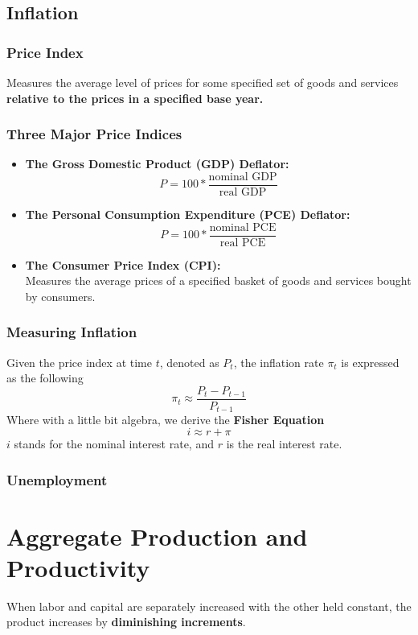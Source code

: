 \documentclass[a4paper]{article}
\begin{document}
\subsection{Inflation}
\subsubsection*{Price Index}
Measures the average level of prices for some specified set of goods and services 
\textbf{relative to the prices in a specified base year.}
\subsubsection*{Three Major Price Indices} \begin{itemize}
    \item \textbf{The Gross Domestic Product (GDP) Deflator:}
    \[ P = 100 * \frac{\text{nominal GDP}}{\text{real GDP}} \]
    \item \textbf{The Personal Consumption Expenditure (PCE) Deflator:}
    \[ P = 100 * \frac{\text{nominal PCE}}{\text{real PCE}} \]
    \item \textbf{The Consumer Price Index (CPI):} \smallskip \\
    Measures the average prices of a specified basket of goods and services bought by consumers.
\end{itemize}
\subsubsection*{Measuring Inflation}
Given the price index at time $t$, denoted as $P_t$, the inflation rate $\pi_t$ is expressed as the following
\[ \pi_t \approx \frac{P_t - P_{t-1}}{P_{t-1}} \]
Where with a little bit algebra, we derive the \textbf{Fisher Equation}
\[ i \approx r + \pi \]
$i$ stands for the nominal interest rate, and $r$ is the real interest rate.
\subsubsection*{Unemployment}

\section{Aggregate Production and Productivity}
When labor and capital are separately increased with the other held constant, 
the product increases by \textbf{diminishing increments}.
\end{document}
